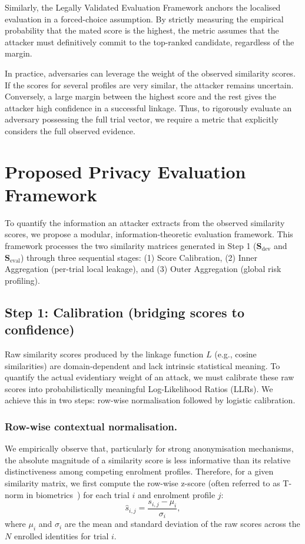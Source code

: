 Similarly, the Legally Validated Evaluation Framework anchors the localised evaluation in a forced-choice assumption. By strictly measuring the empirical probability that the mated score is the highest, the metric assumes that the attacker must definitively commit to the top-ranked candidate, regardless of the margin. 

In practice, adversaries can leverage the weight of the observed similarity scores. If the scores for several profiles are very similar, the attacker remains uncertain. Conversely, a large margin between the highest score and the rest gives the attacker high confidence in a successful linkage. Thus, to rigorously evaluate an adversary possessing the full trial vector, we require a metric that explicitly considers the full observed evidence.


\section{Proposed Privacy Evaluation Framework}
\label{sec:proposed_metric}

To quantify the information an attacker extracts from the observed similarity scores, we propose a modular, information-theoretic evaluation framework. This framework processes the two similarity matrices generated in Step 1 ($\mathbf{S}_{\text{dev}}$ and $\mathbf{S}_{\text{eval}}$) through three sequential stages: (1) Score Calibration, (2) Inner Aggregation (per-trial local leakage), and (3) Outer Aggregation (global risk profiling).


\subsection{Step 1: Calibration (bridging scores to confidence)}
\label{subsec:calibration}
Raw similarity scores produced by the linkage function $L$ (e.g., cosine similarities) are domain-dependent and lack intrinsic statistical meaning. To quantify the actual evidentiary weight of an attack, we must calibrate these raw scores into probabilistically meaningful Log-Likelihood Ratios (LLRs). We achieve this in two steps: row-wise normalisation followed by logistic calibration.




\subsubsection{Row-wise contextual normalisation.} 
We empirically observe that, particularly for strong anonymisation mechanisms, the absolute magnitude of a similarity score is less informative than its relative distinctiveness among competing enrolment profiles. Therefore, for a given similarity matrix, we first compute the row-wise z-score (often referred to as T-norm in biometrics~\cite{auckenthaler2000score}) for each trial $i$ and enrolment profile $j$:
\begin{equation}
    \hat{s}_{i,j} = \frac{s_{i,j} - \mu_i}{\sigma_i},
\end{equation}
where $\mu_i$ and $\sigma_i$ are the mean and standard deviation of the raw scores across the $N$ enrolled identities for trial $i$.

